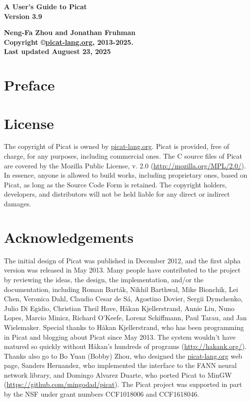 \documentclass[11pt]{report}
\begin{document}
\vspace*{4cm}
\begin{center}
{\Huge\bf A User's Guide to Picat} \\
{\large\bf Version 3.9} \\


\vspace*{1cm}

{\large\bf Neng-Fa Zhou and Jonathan Fruhman} \\
\vspace*{1cm}
{\bf Copyright \copyright \url{picat-lang.org}, 2013-2025.} \\
{\bf Last updated Auguest 23, 2025} \\
\end{center}
\thispagestyle{empty}
\clearpage

\pagestyle{plain}

\section*{Preface}


\clearpage
\section*{License}
The copyright of Picat is owned by \url{picat-lang.org}. Picat is provided, free of charge, for any purposes, including commercial ones. The C source files of Picat are covered by the Mozilla Public License, v. 2.0 (\url{http://mozilla.org/MPL/2.0/}). In essence, anyone is allowed to build works, including proprietary ones, based on Picat, as long as the Source Code Form is retained. The copyright holders, developers, and distributors will not be held liable for any direct or indirect damages.

 
\section*{Acknowledgements}
The initial design of Picat was published in December 2012, and the first alpha version was released in May 2013.  Many people have contributed to the project by reviewing the ideas, the design, the implementation, and/or the documentation, including Roman Bart\'{a}k, Nikhil Barthwal, Mike Bionchik, Lei Chen, Veronica Dahl, Claudio Cesar de S\'{a}, Agostino Dovier, Sergii Dymchenko, Julio Di Egidio, Christian Theil Have, H{\aa}kan Kjellerstrand,  Annie Liu, Nuno Lopes, Marcio Minicz, Richard O'Keefe, Lorenz Schiffmann, Paul Tarau, and Jan Wielemaker.  Special thanks to H{\aa}kan Kjellerstrand, who has been programming in Picat and blogging about Picat since May 2013. The system wouldn't have matured so quickly without H{\aa}kan's hundreds of programs (\url{http://hakank.org/}). Thanks also go to Bo Yuan (Bobby) Zhou, who designed the \url{picat-lang.org} web page, Sanders Hernandez, who implemented the interface to the FANN neural network library, and Domingo Alvarez Duarte, who ported Picat to MinGW (\url{https://github.com/mingodad/picat}). The Picat project was supported in part by the NSF under grant numbers CCF1018006 and CCF1618046.
\end{document}
